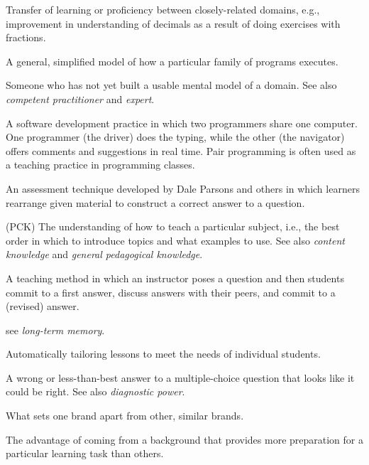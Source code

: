 \begin{description}

 Transfer of learning or
proficiency between closely-related domains, e.g., improvement in
understanding of decimals as a result of doing exercises with
fractions.

 A general, simplified
model of how a particular family of programs executes.

 Someone who has not yet built a usable
mental model of a domain. See also \emph{competent practitioner} and
\emph{expert}.



A software development practice in which two programmers share one
computer. One programmer (the driver) does the typing, while the
other (the navigator) offers comments and suggestions in real
time. Pair programming is often used as a teaching practice in
programming classes.

 An assessment technique
developed by Dale Parsons and others in which learners rearrange given
material to construct a correct answer to a question.

 (PCK) The understanding of how to teach a particular
subject, i.e., the best order in which to introduce topics and what
examples to use. See also \emph{content knowledge} and \emph{general
pedagogical knowledge}.

 A teaching method in
which an instructor poses a question and then students commit to a
first answer, discuss answers with their peers, and commit to a
(revised) answer.

 see \emph{long-term
memory}.

Automatically tailoring lessons to meet the needs of individual
students.

 A wrong or
less-than-best answer to a multiple-choice question that looks like it
could be right. See also \emph{diagnostic power}.

 What sets one brand apart from
other, similar brands.

 The
advantage of coming from a background that provides more preparation
for a particular learning task than others.


\end{description}
